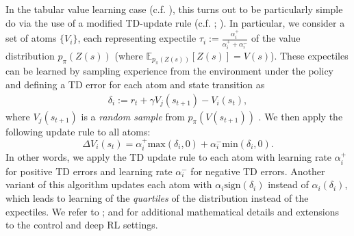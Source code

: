 In the tabular value learning case (c.f. ), this turns out to be particularly simple do via the use of a modified TD-update rule (c.f. ; \citealp{lowet2020distributional}).
In particular, we consider a set of atoms $\{ V_i \}$, each representing expectile $\tau_i := \frac{\alpha_i^+}{\alpha_i^+ + \alpha_i^-}$ of the value distribution $p_\pi(Z(s))$ (where $\mathbb{E}_{ p_\pi(Z(s))} \left [ Z(s) \right ] = V(s)$).
These expectiles can be learned by sampling experience from the environment under the policy and defining a TD error for each atom and state transition as
\begin{align}
    \delta_i := r_t + \gamma V_j(s_{t+1}) - V_i(s_t),
\end{align}
where $V_j(s_{t+1})$ is a \emph{random sample} from  $p_\pi(V(s_{t+1}))$ \citep{lowet2020distributional,dabney2020distributional}.
We then apply the following update rule to all atoms:
\begin{equation}
    \label{eq:DRL_V_expec}
    \Delta V_i(s_t) = \alpha_i^+ \text{max}(\delta_i, 0 ) + \alpha_i^- \text{min}(\delta_i, 0).
\end{equation}
In other words, we apply the TD update rule to each atom with learning rate $\alpha_i^+$ for positive TD errors and learning rate $\alpha_i^-$ for negative TD errors.
Another variant of this algorithm updates each atom with $\alpha_i \text{sign}(\delta_i)$ instead of $\alpha_i (\delta_i)$, which leads to learning of the \emph{quartiles} of the distribution instead of the expectiles.
We refer to \citet{bellemare2017distributional,dabney2018distributional,rowland2019statistics,bellemare2023distributional}; and \citet{dabney2020distributional} for additional mathematical details and extensions to the control and deep RL settings.



